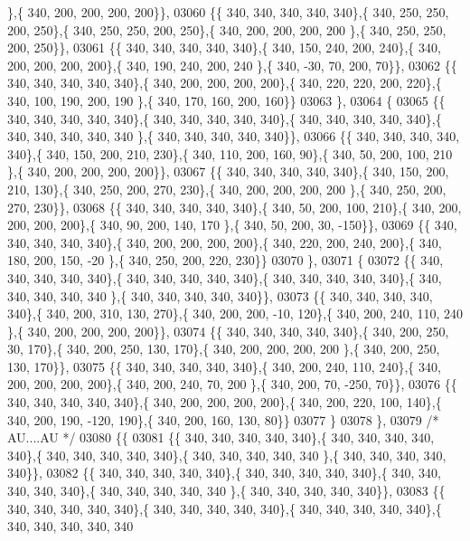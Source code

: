 \begin{DoxyCode}
      \},\{ 340, 200, 200, 200, 200\}\},
03060 \{\{ 340, 340, 340, 340, 340\},\{ 340, 250, 250, 200, 250\},\{ 340, 250, 250, 200, 250\},\{ 340, 200, 200, 200, 200
      \},\{ 340, 250, 250, 200, 250\}\},
03061 \{\{ 340, 340, 340, 340, 340\},\{ 340, 150, 240, 200, 240\},\{ 340, 200, 200, 200, 200\},\{ 340, 190, 240, 200, 240
      \},\{ 340, -30,  70, 200,  70\}\},
03062 \{\{ 340, 340, 340, 340, 340\},\{ 340, 200, 200, 200, 200\},\{ 340, 220, 220, 200, 220\},\{ 340, 100, 190, 200, 190
      \},\{ 340, 170, 160, 200, 160\}\}
03063 \},
03064 \{
03065 \{\{ 340, 340, 340, 340, 340\},\{ 340, 340, 340, 340, 340\},\{ 340, 340, 340, 340, 340\},\{ 340, 340, 340, 340, 340
      \},\{ 340, 340, 340, 340, 340\}\},
03066 \{\{ 340, 340, 340, 340, 340\},\{ 340, 150, 200, 210, 230\},\{ 340, 110, 200, 160,  90\},\{ 340,  50, 200, 100, 210
      \},\{ 340, 200, 200, 200, 200\}\},
03067 \{\{ 340, 340, 340, 340, 340\},\{ 340, 150, 200, 210, 130\},\{ 340, 250, 200, 270, 230\},\{ 340, 200, 200, 200, 200
      \},\{ 340, 250, 200, 270, 230\}\},
03068 \{\{ 340, 340, 340, 340, 340\},\{ 340,  50, 200, 100, 210\},\{ 340, 200, 200, 200, 200\},\{ 340,  90, 200, 140, 170
      \},\{ 340,  50, 200,  30, -150\}\},
03069 \{\{ 340, 340, 340, 340, 340\},\{ 340, 200, 200, 200, 200\},\{ 340, 220, 200, 240, 200\},\{ 340, 180, 200, 150, -20
      \},\{ 340, 250, 200, 220, 230\}\}
03070 \},
03071 \{
03072 \{\{ 340, 340, 340, 340, 340\},\{ 340, 340, 340, 340, 340\},\{ 340, 340, 340, 340, 340\},\{ 340, 340, 340, 340, 340
      \},\{ 340, 340, 340, 340, 340\}\},
03073 \{\{ 340, 340, 340, 340, 340\},\{ 340, 200, 310, 130, 270\},\{ 340, 200, 200, -10, 120\},\{ 340, 200, 240, 110, 240
      \},\{ 340, 200, 200, 200, 200\}\},
03074 \{\{ 340, 340, 340, 340, 340\},\{ 340, 200, 250,  30, 170\},\{ 340, 200, 250, 130, 170\},\{ 340, 200, 200, 200, 200
      \},\{ 340, 200, 250, 130, 170\}\},
03075 \{\{ 340, 340, 340, 340, 340\},\{ 340, 200, 240, 110, 240\},\{ 340, 200, 200, 200, 200\},\{ 340, 200, 240,  70, 200
      \},\{ 340, 200,  70, -250,  70\}\},
03076 \{\{ 340, 340, 340, 340, 340\},\{ 340, 200, 200, 200, 200\},\{ 340, 200, 220, 100, 140\},\{ 340, 200, 190, -120, 
      190\},\{ 340, 200, 160, 130,  80\}\}
03077 \}
03078 \},
03079 \textcolor{comment}{/* AU....AU */}
03080 \{\{
03081 \{\{ 340, 340, 340, 340, 340\},\{ 340, 340, 340, 340, 340\},\{ 340, 340, 340, 340, 340\},\{ 340, 340, 340, 340, 340
      \},\{ 340, 340, 340, 340, 340\}\},
03082 \{\{ 340, 340, 340, 340, 340\},\{ 340, 340, 340, 340, 340\},\{ 340, 340, 340, 340, 340\},\{ 340, 340, 340, 340, 340
      \},\{ 340, 340, 340, 340, 340\}\},
03083 \{\{ 340, 340, 340, 340, 340\},\{ 340, 340, 340, 340, 340\},\{ 340, 340, 340, 340, 340\},\{ 340, 340, 340, 340, 340

\end{DoxyCode}

